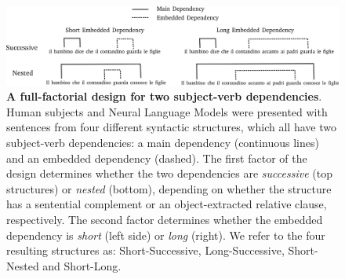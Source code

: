 \begin{figure}[ht]
    \centering
    \includegraphics[width=\textwidth]{figures/design.png}
    \caption{\textbf{A full-factorial design for two subject-verb dependencies}. Human subjects and Neural Language Models were presented with sentences from four different syntactic structures, which all have two subject-verb dependencies: a main dependency (continuous lines) and an embedded dependency (dashed). The first factor of the design determines whether the two dependencies are \textit{successive} (top structures) or \textit{nested} (bottom), depending on whether the structure has a sentential complement or an object-extracted relative clause, respectively. The second factor determines whether the embedded dependency is \textit{short} (left side) or \textit{long} (right). We refer to the four resulting structures as: Short-Successive, Long-Successive, Short-Nested and Short-Long.}
    \label{fig:design}
\end{figure}

